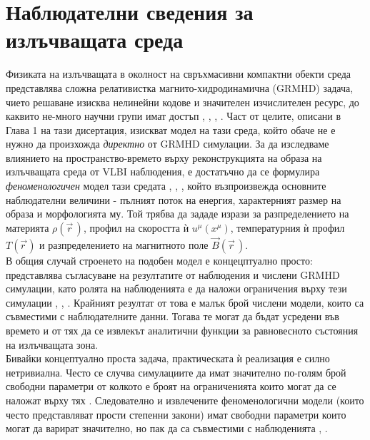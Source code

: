 \section{Наблюдателни сведения за излъчващата среда}

Физиката на излъчващата в околност на свръхмасивни компактни обекти среда представлява сложна релативистка магнито-хидродинамична (GRMHD) задача, чието решаване изисква нелинейни кодове и значителен изчислителен ресурс, до каквито не-много научни групи имат достъп \cite{Yao2021}, \cite{Anantua2024}, \cite{Davelaar2019}, \cite{Davis2020}. Част от целите, описани в Глава 1 на тази дисертация, изискват модел на тази среда, който обаче не е нужно да произхожда \emph{директно} от GRMHD симулации. За да изследваме влиянието на пространство-времето върху реконструкцията на образа на излъчващата среда от VLBI наблюдения, е достатъчно да се формулира \emph{феноменологичен} модел тази средата \cite{Chatterjee2022}, \cite{Yuan2003}, \cite{Broderick2005}, който възпроизвежда основните наблюдателни величини - пълният поток на енергия, характерният размер на образа и морфологията му. Той трябва да зададе изрази за разпределението на материята $\rho(\vec{r}\,)$, профил на скоростта ѝ $u^\mu (x^\mu)$, температурния ѝ профил $T(\vec{r\,})$ и разпределението на магнитното поле $\vec{B}(\vec{r}\,)$.\\

В общия случай строенето на подобен модел е концецптуално просто: представлява съгласуване на резултатите от наблюдения и числени GRMHD симулации, като ролята на наблюденията е да наложи ограничения върху тези симулации \cite{EHT_SGR_V}, \cite{EHT_SGR_VII}, \cite{EHT_SGR_VIII} . Крайният резултат от това е малък брой числени модели, които са съвместими с наблюдателните данни. Тогава те могат да бъдат усредени във времето и от тях да се извлекът аналитични функции за равновесното състояния на излъчващата зона.\\ 

Бивайки концептуално проста задача, практическата ѝ реализация е силно нетривиална. Често се случва симулациите да имат значително по-голям брой свободни параметри от колкото е броят на ограниченията които могат да се наложат върху тях \cite{EHT_M87_IX}. Следователно и извлечените феноменологични модели (които често представляват прости степенни закони) имат свободни параметри които могат да варират значително, но пак да са съвместими с наблюденията \cite{Gold2020}, \cite{Broderick2021}.\\

